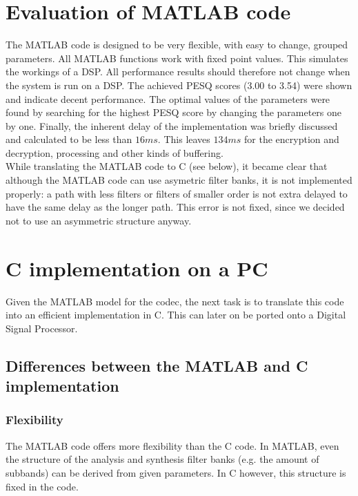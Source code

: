 \documentclass[a4paper]{article}
\begin{document}
\section{Evaluation of MATLAB code}
The MATLAB code is designed to be very flexible, with easy to change, grouped parameters. All MATLAB functions work with fixed point values. This simulates the workings of a DSP. All performance results should therefore not change when the system is run on a DSP. The achieved PESQ scores (3.00 to 3.54) were shown and indicate decent performance. The optimal values of the parameters were found by searching for the highest PESQ score by changing the parameters one by one. Finally, the inherent delay of the implementation was briefly discussed and calculated to be less than $16ms$. This leaves $134ms$ for the encryption and decryption, processing and other kinds of buffering.\\


While translating the MATLAB code to C (see below), it became clear that although the MATLAB code can use asymetric filter banks, it is not implemented properly: a path with less filters or filters of smaller order is not extra delayed to have the same delay as the longer path. This error is not fixed, since we decided not to use an asymmetric structure anyway.

\section{C implementation on a PC}
Given the MATLAB model for the codec, the next task is to translate this code into an efficient implementation in C. This can later on be ported onto a Digital Signal Processor.
\subsection{Differences between the MATLAB and C implementation}\label{sec:differences}
\subsubsection{Flexibility}
The MATLAB code offers more flexibility than the C code. In MATLAB, even the structure of the analysis and synthesis filter banks (e.g. the amount of subbands) can be derived from given parameters. In C however, this structure is fixed in the code.\\
\end{document}

